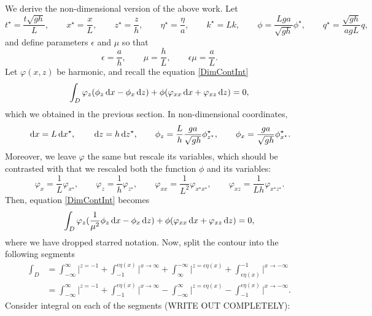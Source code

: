 \documentclass[10pt,reqno,oneside,a4paper]{article}
\begin{document}
We derive the non-dimensional version of the above work. Let 
\begin{equation}\label{NDcoord}
t^{\star} = \frac{t \sqrt{gh}}{L}, \qquad x^{\star}  = \frac{x}{L}, \qquad z^{\star}  = \frac{z}{h}, \qquad \eta^{\star}  = \frac{\eta}{a}, \qquad k^{\star}  = Lk, \qquad \phi = \frac{Lga}{\sqrt{gh}} \phi^{\star}, \qquad q^{\star}  = \frac{\sqrt{gh}}{agL} q,
\end{equation}
and define parameters $\epsilon$ and $\mu$ so that
\[ 
\epsilon = \frac{a}{h}, \qquad \mu = \frac{h}{L}, \qquad \epsilon \mu = \frac{a}{L}.
\] 
Let $\varphi(x,z)$ be harmonic, and recall the equation \eqref{DimContInt}
\begin{equation*}
\int_D \varphi_z(\phi_z \,\mathrm{d} x - \phi_x \,\mathrm{d} z) + \phi(\varphi_{xx} \,\mathrm{d} x + \varphi_{xz} \,\mathrm{d} z) = 0,
\end{equation*}
which we obtained in the previous section.
In non-dimensional coordinates,
\[ 
\,\mathrm{d} x = L \,\mathrm{d} x^{\star}, \qquad \,\mathrm{d} z = h \,\mathrm{d} z^{\star}, \qquad \phi_z = \frac{L}{h}\frac{ga}{\sqrt{gh}} \phi^{\star}_{z^{\star}}, \qquad \phi_x = \frac{ga}{\sqrt{gh}} \phi^{\star}_{x^{\star}}.
\]
Moreover, we leave $\varphi$ the same but rescale its variables, which should be contrasted with that we rescaled both the function $\phi$ and its variables:
\[ 
\varphi_x = \frac{1}{L} \varphi_{x^{\star}}, \qquad \varphi_z = \frac{1}{h} \varphi_{z^{\star}}, \qquad \varphi_{xx} = \frac{1}{L^2} \varphi_{x^{\star}x^{\star}}, \qquad \varphi_{xz} = \frac{1}{Lh} \varphi_{x^{\star}z^{\star}}.
\]
Then, equation \eqref{DimContInt} becomes 
\begin{equation}\label{NDimContIn}
\int_D \varphi_z(\frac{1}{\mu^2}\phi_z \,\mathrm{d} x - \phi_x \,\mathrm{d} z) + \phi(\varphi_{xx} \,\mathrm{d} x + \varphi_{xz} \,\mathrm{d} z) = 0,
\end{equation}
where we have dropped starred notation. Now, split the contour into the following segments
\begin{align*}
\int_D &= \int_{-\infty}^{\infty} \bigg|^{z = -1} + \int_{-1}^{\epsilon\eta(x)} \bigg|^{x  \to \infty} + \int^{-\infty}_{\infty} \bigg|^{z = \epsilon\eta(x)} + \int_{\epsilon\eta(x)}^{-1} \bigg|^{x \to -\infty} \\
&= \int_{-\infty}^{\infty} \bigg|^{z = -1} + \int_{-1}^{\epsilon\eta(x)} \bigg|^{x  \to \infty} - \int^{\infty}_{-\infty} \bigg|^{z = \epsilon\eta(x)} - \int^{\epsilon\eta(x)}_{-1} \bigg|^{x \to -\infty}.
\end{align*}
Consider integral on each of the segments (WRITE OUT COMPLETELY):
\end{document}
